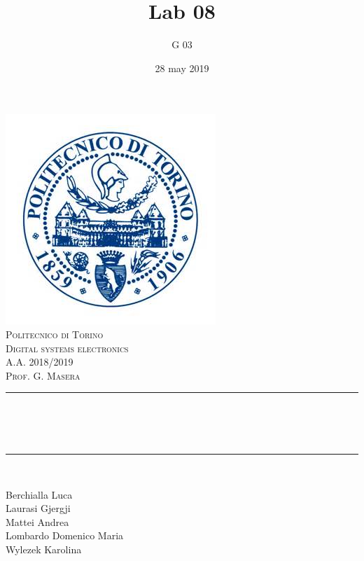 \documentclass[12pt]{article}
\title{Lab 08}													%
\author{G 03}														%
\date{28 may 2019}														%
\makeatletter
\let\thetitle\@title
\let\thedate\@date
\makeatother
\begin{document}

\begin{titlepage}
	\centering
    \vspace*{0.5 cm}
    \includegraphics[scale = 0.75]{polito.jpg}\\[1.0 cm]				%
    \textsc{\LARGE Politecnico di Torino}\\[2.0 cm]						%
	\textsc{\Large Digital systems electronics\\ A.A. 2018/2019}\\[0.5 cm]		%
	\textsc{\Large Prof. G. Masera}\\[0.5 cm]		%
	\rule{\linewidth}{0.2 mm} \\[0.4 cm]
	{ \huge \bfseries \thetitle \\ \small \thedate}\\
	\rule{\linewidth}{0.2 mm} \\[1.5 cm]
	
	\begin{minipage}{0.4\textwidth}
		\begin{flushleft} \large
			Berchialla Luca\\												%
			Laurasi Gjergji
			\\
			
			Mattei Andrea\\
            Lombardo Domenico Maria\\
            Wylezek Karolina
            
			\end{flushleft}
			\end{minipage}~
			\begin{minipage}{0.4\textwidth}
            

\end{minipage}
\end{titlepage}
\end{document}
